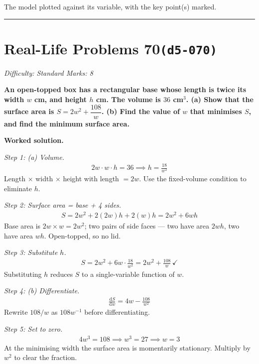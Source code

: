 \documentclass[11pt]{article}
\newcommand{\question}[1]{\par\medskip\noindent\textbf{#1}\par}
\begin{document}
\small The model plotted against its variable, with the key point(s) marked.\normalsize

\medskip\hrule

\section*{Real-Life Problems 70\quad\small\texttt{(d5-070)}}
\textit{Difficulty: Standard \quad\textbar\quad Marks: 8}

\question{An open-topped box has a rectangular base whose length is twice its width \( w \) cm, and height \( h \) cm. The volume is \( 36 \) cm\(^3\). (a) Show that the surface area is \( S = 2w^2 + \dfrac{108}{w} \). (b) Find the value of \( w \) that minimises \( S \), and find the minimum surface area.}

\textbf{Worked solution.}

\textit{Step 1: (a) Volume.}
\[\begin{gathered}
2w \cdot w \cdot h = 36 \implies h = \frac{18}{w^2}
\end{gathered}\]
Length \( \times \) width \( \times \) height with length \( = 2w \). Use the fixed-volume condition to eliminate \( h \).

\textit{Step 2: Surface area = base + 4 sides.}
\[\begin{gathered}
S = 2w^2 + 2(2w)h + 2(w)h = 2w^2 + 6wh
\end{gathered}\]
Base area is \( 2w \times w = 2w^2 \); two pairs of side faces --- two have area \( 2wh \), two have area \( wh \). Open-topped, so no lid.

\textit{Step 3: Substitute \( h \).}
\[\begin{gathered}
S = 2w^2 + 6w \cdot \frac{18}{w^2} = 2w^2 + \frac{108}{w} \, \checkmark
\end{gathered}\]
Substituting \( h \) reduces \( S \) to a single-variable function of \( w \).

\textit{Step 4: (b) Differentiate.}
\[\begin{gathered}
\frac{\mathrm{d}S}{\mathrm{d}w} = 4w - \frac{108}{w^2}
\end{gathered}\]
Rewrite \( 108/w \) as \( 108w^{-1} \) before differentiating.

\textit{Step 5: Set to zero.}
\[\begin{gathered}
4w^3 = 108 \implies w^3 = 27 \implies w = 3
\end{gathered}\]
At the minimising width the surface area is momentarily stationary. Multiply by \( w^2 \) to clear the fraction.
\end{document}
